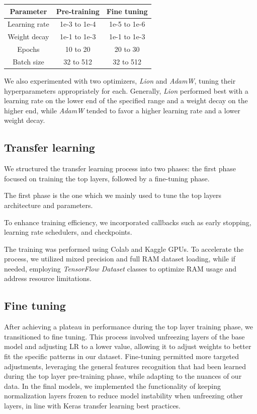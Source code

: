 \documentclass[11pt]{article}
\begin{document}
\begin{table}[h!]
    \centering
    \begin{tabular}{|c|c|c|}
        \hline
        \textbf{Parameter} & \textbf{Pre-training} & \textbf{Fine tuning} \\ \hline
        Learning rate & 1e-3 to 1e-4 & 1e-5 to 1e-6 \\ \hline
        Weight decay & 1e-1 to 1e-3 & 1e-1 to 1e-3 \\ \hline
        Epochs & 10 to 20 & 20 to 30 \\ \hline
        Batch size & 32 to 512 & 32 to 512 \\ \hline
    \end{tabular}
\end{table}

We also experimented with two optimizers, \textit{Lion} and \textit{AdamW}, tuning their hyperparameters appropriately for each. Generally, \textit{Lion} performed best with a learning rate on the lower end of the specified range and a weight decay on the higher end, while \textit{AdamW} tended to favor a higher learning rate and a lower weight decay.

\subsection{Transfer learning}

We structured the transfer learning process into two phases: the first phase focused on training the top layers, followed by a fine-tuning phase.

The first phase is the one which we mainly used to tune the top layers architecture and parameters.

To enhance training efficiency, we incorporated callbacks such as early stopping, learning rate schedulers, and checkpoints.

The training was performed using Colab and Kaggle GPUs. To accelerate the process, we utilized mixed precision and full RAM dataset loading, while if needed, employing \textit{TensorFlow Dataset} classes to optimize RAM usage and address resource limitations.

\subsection{Fine tuning}

After achieving a plateau in performance during the top layer training phase, we transitioned to fine tuning. 
This process involved unfreezing layers of the base model and adjusting LR to a lower value, allowing it to adjust weights to better fit the specific patterns in our dataset. 
Fine-tuning permitted more targeted adjustments, leveraging the general features recognition that had been learned during the top layer pre-training phase, while adapting to the nuances of our data. In the final models, we implemented the functionality of keeping normalization layers frozen to reduce model instability when unfreezing other layers, in line with Keras transfer learning best practices.
\end{document}
